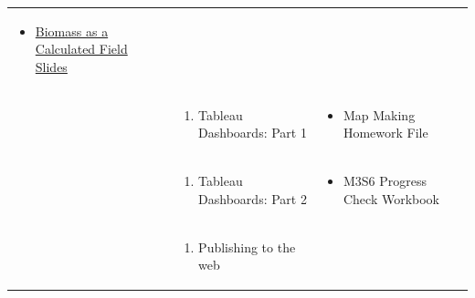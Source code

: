 \documentclass[
]{book}
\providecommand{\tightlist}{%
  \setlength{\itemsep}{0pt}\setlength{\parskip}{0pt}}
\begin{document}
\begin{longtable}[]{@{}lll@{}}
\begin{minipage}[t]{0.42\columnwidth}
\begin{itemize}
\tightlist
\item
  \href{files/M3S4_calculated_field_biomass_example.pdf}{Biomass as a Calculated Field Slides}
\end{itemize}\strut
\end{minipage}\tabularnewline
\begin{minipage}[t]{0.15\columnwidth}\raggedright
\strut
\end{minipage} & \begin{minipage}[t]{0.34\columnwidth}\raggedright
\begin{enumerate}
\def\labelenumi{\arabic{enumi}.}
\setcounter{enumi}{4}
\tightlist
\item
  Tableau Dashboards: Part 1
\end{enumerate}\strut
\end{minipage} & \begin{minipage}[t]{0.42\columnwidth}\raggedright
\begin{itemize}
\tightlist
\item
  Map Making Homework File
\end{itemize}\strut
\end{minipage}\tabularnewline
\begin{minipage}[t]{0.15\columnwidth}\raggedright
\strut
\end{minipage} & \begin{minipage}[t]{0.34\columnwidth}\raggedright
\begin{enumerate}
\def\labelenumi{\arabic{enumi}.}
\setcounter{enumi}{5}
\tightlist
\item
  Tableau Dashboards: Part 2
\end{enumerate}\strut
\end{minipage} & \begin{minipage}[t]{0.42\columnwidth}\raggedright
\begin{itemize}
\tightlist
\item
  M3S6 Progress Check Workbook
\end{itemize}\strut
\end{minipage}\tabularnewline
\begin{minipage}[t]{0.15\columnwidth}\raggedright
\strut
\end{minipage} & \begin{minipage}[t]{0.34\columnwidth}\raggedright
\begin{enumerate}
\def\labelenumi{\arabic{enumi}.}
\setcounter{enumi}{6}
\tightlist
\item
  Publishing to the web
\end{enumerate}\strut

\end{minipage}
\end{longtable}
\end{document}
